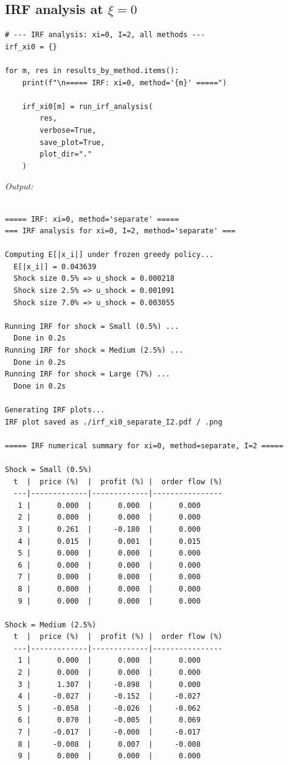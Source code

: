 \subsection{IRF analysis at $\xi=0$}

\begin{lstlisting}[style=pythonstyle]
# --- IRF analysis: xi=0, I=2, all methods ---
irf_xi0 = {}

for m, res in results_by_method.items():
    print(f"\n===== IRF: xi=0, method='{m}' =====")

    irf_xi0[m] = run_irf_analysis(
        res,
        verbose=True,
        save_plot=True,
        plot_dir="."
    )
\end{lstlisting}

\noindent\textit{Output:}
\begin{lstlisting}[style=outputstyle]

===== IRF: xi=0, method='separate' =====
=== IRF analysis for xi=0, I=2, method='separate' ===

Computing E[|x_i|] under frozen greedy policy...
  E[|x_i|] = 0.043639
  Shock size 0.5% => u_shock = 0.000218
  Shock size 2.5% => u_shock = 0.001091
  Shock size 7.0% => u_shock = 0.003055

Running IRF for shock = Small (0.5%) ...
  Done in 0.2s
Running IRF for shock = Medium (2.5%) ...
  Done in 0.2s
Running IRF for shock = Large (7%) ...
  Done in 0.2s

Generating IRF plots...
IRF plot saved as ./irf_xi0_separate_I2.pdf / .png

===== IRF numerical summary for xi=0, method=separate, I=2 =====

Shock = Small (0.5%)
  t  |  price (%)  |  profit (%) |  order flow (%)
  ---|-------------|-------------|----------------
   1 |      0.000  |      0.000  |      0.000
   2 |      0.000  |      0.000  |      0.000
   3 |      0.261  |     -0.180  |      0.000
   4 |      0.015  |      0.001  |      0.015
   5 |      0.000  |      0.000  |      0.000
   6 |      0.000  |      0.000  |      0.000
   7 |      0.000  |      0.000  |      0.000
   8 |      0.000  |      0.000  |      0.000
   9 |      0.000  |      0.000  |      0.000

Shock = Medium (2.5%)
  t  |  price (%)  |  profit (%) |  order flow (%)
  ---|-------------|-------------|----------------
   1 |      0.000  |      0.000  |      0.000
   2 |      0.000  |      0.000  |      0.000
   3 |      1.307  |     -0.898  |      0.000
   4 |     -0.027  |     -0.152  |     -0.027
   5 |     -0.058  |     -0.026  |     -0.062
   6 |      0.070  |     -0.005  |      0.069
   7 |     -0.017  |     -0.000  |     -0.017
   8 |     -0.008  |      0.007  |     -0.008
   9 |      0.000  |      0.000  |      0.000


\end{lstlisting}
